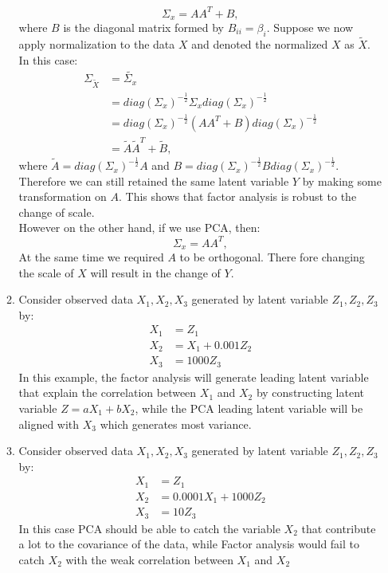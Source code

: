 \documentclass{article}
\begin{document}
\begin{enumerate}
\begin{enumerate}
\begin{equation}
\Sigma_{x} = AA^T + B \label{eqn_factor_cov},
\end{equation}
where $B$ is the diagonal matrix formed by $B_{ii} = \beta_i$. Suppose we now apply normalization to the data $X$ and denoted the normalized $X$ as $\tilde{X}$. In this case: 
\begin{align}
\Sigma_{\tilde{X}} &= \tilde{\Sigma_{x}}\\
&= diag(\Sigma_{x})^{-\frac{1}{2}} \Sigma_{x} diag(\Sigma_{x})^{-\frac{1}{2}}\\
&=diag(\Sigma_{x})^{-\frac{1}{2}} (AA^T + B) diag(\Sigma_{x})^{-\frac{1}{2}}\\
&=\tilde{A} \tilde{A}^T + \tilde{B},
\end{align}
where $\tilde{A} = diag(\Sigma_{x})^{-\frac{1}{2}}A$ and $B=diag(\Sigma_{x})^{-\frac{1}{2}}B diag(\Sigma_{x})^{-\frac{1}{2}}$. Therefore we can still  retained the same latent variable $Y$ by making some transformation on $A$. This shows that factor analysis is robust to the change of scale. \\
However on the other hand, if we use PCA, then:
\begin{equation}
\Sigma_{x} = AA^T \label{eqn_pca_cov},
\end{equation}
At the same time we required $A$ to be orthogonal. There fore changing the scale of $X$ will result in the change of $Y$.
\pagebreak
\item 
Consider observed data $X_1, X_2, X_3$ generated by latent variable $Z_1, Z_2, Z_3$ by:
\begin{align*}
X_1 &= Z_1\\
X_2 &= X_1 + 0.001Z_2\\
X_3 &= 1000 Z_3
\end{align*}
In this example, the factor analysis will generate leading latent variable that explain the correlation between $X_1$ and $X_2$ by constructing latent variable $Z = aX_1 + bX_2$, while the PCA leading latent variable will be aligned with $X_3$ which generates most variance.
\pagebreak
\item 
Consider observed data $X_1, X_2, X_3$ generated by latent variable $Z_1, Z_2, Z_3$ by:
\begin{align*}
X_1 &= Z_1\\
X_2 &= 0.0001X_1 + 1000Z_2\\
X_3 &= 10Z_3
\end{align*}
In this case PCA should be able to catch the variable $X_2$ that contribute a lot to the covariance of the data, while Factor analysis would fail to catch $X_2$ with the weak correlation between $X_1$ and $X_2$
\pagebreak



\end{enumerate}
\end{enumerate}
\end{document}
